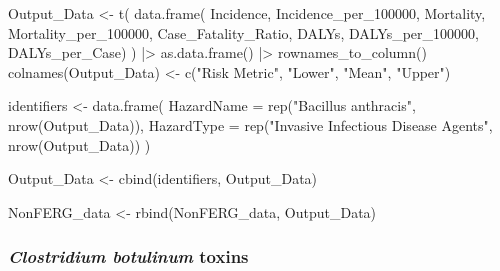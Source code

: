 \documentclass[
  letterpaper,
  DIV=11,
  numbers=noendperiod]{scrartcl}
\newenvironment{Shaded}{\begin{snugshade}}{\end{snugshade}}
\newcommand{\AttributeTok}[1]{\textcolor[rgb]{0.40,0.45,0.13}{#1}}
\newcommand{\FunctionTok}[1]{\textcolor[rgb]{0.28,0.35,0.67}{#1}}
\newcommand{\NormalTok}[1]{\textcolor[rgb]{0.00,0.23,0.31}{#1}}
\newcommand{\OtherTok}[1]{\textcolor[rgb]{0.00,0.23,0.31}{#1}}
\newcommand{\SpecialCharTok}[1]{\textcolor[rgb]{0.37,0.37,0.37}{#1}}
\newcommand{\StringTok}[1]{\textcolor[rgb]{0.13,0.47,0.30}{#1}}
\begin{document}
\begin{Shaded}
\begin{Highlighting}[]
\NormalTok{Output\_Data }\OtherTok{\textless{}{-}} \FunctionTok{t}\NormalTok{(}
 \FunctionTok{data.frame}\NormalTok{(}
\NormalTok{ Incidence,  Incidence\_per\_100000, }
\NormalTok{ Mortality,  Mortality\_per\_100000, }
\NormalTok{ Case\_Fatality\_Ratio, }
\NormalTok{ DALYs,  DALYs\_per\_100000,  DALYs\_per\_Case)}
\NormalTok{ ) }\SpecialCharTok{|\textgreater{}} 
 \FunctionTok{as.data.frame}\NormalTok{() }\SpecialCharTok{|\textgreater{}} 
 \FunctionTok{rownames\_to\_column}\NormalTok{()}
\FunctionTok{colnames}\NormalTok{(Output\_Data) }\OtherTok{\textless{}{-}} \FunctionTok{c}\NormalTok{(}\StringTok{"Risk Metric"}\NormalTok{,  }\StringTok{"Lower"}\NormalTok{,  }\StringTok{"Mean"}\NormalTok{,  }\StringTok{"Upper"}\NormalTok{)}

\NormalTok{identifiers }\OtherTok{\textless{}{-}} \FunctionTok{data.frame}\NormalTok{(}
 \AttributeTok{HazardName =} \FunctionTok{rep}\NormalTok{(}\StringTok{"Bacillus anthracis"}\NormalTok{,  }\FunctionTok{nrow}\NormalTok{(Output\_Data)), }
 \AttributeTok{HazardType =} \FunctionTok{rep}\NormalTok{(}\StringTok{"Invasive Infectious Disease Agents"}\NormalTok{,  }\FunctionTok{nrow}\NormalTok{(Output\_Data))}
\NormalTok{ )}
         
\NormalTok{Output\_Data }\OtherTok{\textless{}{-}} \FunctionTok{cbind}\NormalTok{(identifiers,  Output\_Data)}

\NormalTok{NonFERG\_data }\OtherTok{\textless{}{-}} \FunctionTok{rbind}\NormalTok{(NonFERG\_data, Output\_Data)}
\end{Highlighting}
\end{Shaded}

\subsubsection{\texorpdfstring{\emph{Clostridium botulinum}
toxins}{Clostridium botulinum toxins}}\label{clostridium-botulinum-toxins}
\end{document}
